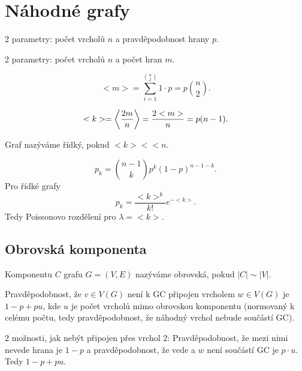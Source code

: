 \documentclass[12pt]{article}					%
\begin{document}
\section{Náhodné grafy}
    \begin{definice}
        2 parametry: počet vrcholů $n$ a pravděpodobnost hrany $p$.
    \end{definice}

    \begin{definice}
        2 parametry: počet vrcholů $n$ a počet hran $m$.
    \end{definice}

    \begin{definice}
        $$ <m> = \sum_{i=1}^{\binom{n}{2}}1·p = p\binom{n}{2}. $$ 
    \end{definice}

    \begin{definice}
        $$ <k> = \left\langle\frac{2m}{n}\right\rangle = \frac{2<m>}{n} = p(n-1). $$
    \end{definice}

    \begin{definice}
        Graf nazýváme řídký, pokud $<k> << n$.
    \end{definice}

    \begin{definice}
        $$ p_k = \binom{n - 1}{k}p^k(1 - p)^{n - 1 - k}. $$
        Pro řídké grafy
        $$ p_k = \frac{<k>^k}{k!}e^{-<k>}. $$ 
        Tedy Poissonovo rozdělení pro $\lambda = <k>$.
    \end{definice}

    \subsection{Obrovská komponenta}
    \begin{definice}
            Komponentu $C$ grafu $G = (V, E)$ nazýváme obrovská, pokud $|C| \sim |V|$.
        \end{definice}

        \begin{lemma}
            Pravděpodobnost, že $v \in V(G)$ není k GC připojen vrcholem $w \in V(G)$ je $1 - p + pu$, kde $u$ je počet vrcholů mimo obrovskou komponentu (normovaný k celému počtu, tedy pravděpodobnost, že náhodný vrchol nebude součástí GC).

            \begin{dukazin}
                2 možnosti, jak nebýt připojen přes vrchol $2$: Pravděpodobnost, že mezi nimi nevede hrana je $1 - p$ a pravděpodobnost, že vede a $w$ není součástí GC je $p·u$. Tedy $1-p+pu$.
            \end{dukazin}
        \end{lemma}
\end{document}
